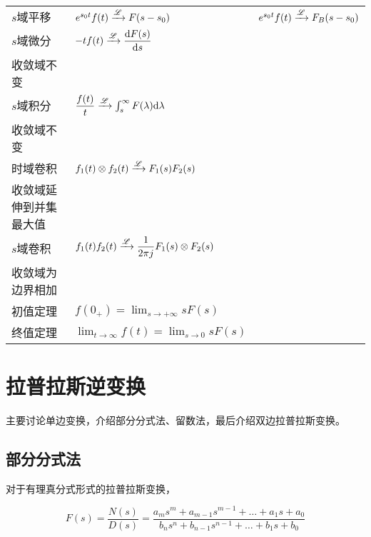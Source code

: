 \documentclass[cn,11pt,chinese,black,simple]{../elegantbook}
\begin{document}
\begin{longtable}{lll}
    \(s\)域平移 & \(e^{s_0 t} f(t) \xrightarrow{\mathscr{L}} F(s-s_0)\) & \(e^{s_0 t} f(t) \xrightarrow{\mathscr{L}} F_B(s-s_0)\) \\
    \(s\)域微分 & \(-t f(t) \xrightarrow{\mathscr{L}} \dfrac{\mathrm{d}F(s)}{\mathrm{d}s}\) &\begin{tabular}[c]{@{}l@{}}\(-t f(t) \lta \dfrac{\dd{F_B(s)}}{\dd{s}}\)\\ 收敛域不变\end{tabular}\\
    \(s\)域积分 & \(\dfrac{f(t)}{t} \xrightarrow{\mathscr{L}} \int_{s}^{\infty} F(\lambda)\mathrm{d}\lambda\) &\begin{tabular}[c]{@{}l@{}}\(\dfrac{f(t)}{t} \lta \int_{s}^{\infty} F_B(\lambda)\dd{\lambda}\) \\ 收敛域不变\end{tabular}\\
    时域卷积 & \(f_1(t) \otimes f_2(t) \xrightarrow{\mathscr{L}} F_1(s) F_2(s)\) & \begin{tabular}[c]{@{}l@{}}\(f_1(t) \otimes f_2(t) \lta F_{B,1}(s) F_{B,2}(s)\)\\ 收敛域延伸到并集最大值\end{tabular} \\
    \(s\)域卷积 & \(f_1(t) f_2(t) \xrightarrow{\mathscr{L}} \dfrac{1}{2 \pi j} F_1(s) \otimes F_2(s)\) & \begin{tabular}[c]{@{}l@{}}\(f_1{t} f_2{t} \lta \dfrac{1}{2 \pi j} F_1(s) \otimes F_2(s)\)\\ 收敛域为边界相加\end{tabular} \\
    初值定理 & \(f(0_+) = \lim_{s\rightarrow +\infty }s F(s)\) & \\
    终值定理 & $\lim _{t \rightarrow \infty} f(t)=\lim _{s \rightarrow 0} s F(s)$ & \\
\end{longtable}


\section{拉普拉斯逆变换}

主要讨论单边变换，介绍部分分式法、留数法，最后介绍双边拉普拉斯变换。

\subsection{部分分式法}

对于有理真分式形式的拉普拉斯变换，

\[F(s)=\dfrac{N(s)}{D(s)}=\dfrac{a_{m} s^{m}+a_{m-1} s^{m-1}+\ldots+a_{1} s+a_{0}}{b_{n} s^{n}+b_{n-1} s^{n-1}+\ldots+b_{1} s+b_{0}}\]
\end{document}
